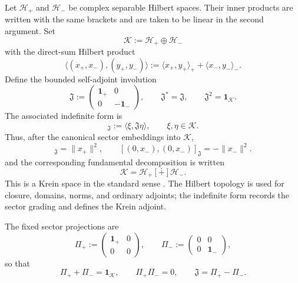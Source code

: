 \documentclass[11pt,reqno]{scrartcl}
\newcommand{\scrK}{\mathscr K}
\newcommand{\scrHp}{\mathscr H_{+}}
\newcommand{\scrHm}{\mathscr H_{-}}
\newcommand{\fundJ}{\mathfrak J}
\newcommand{\Pp}{\Pi_{+}}
\newcommand{\Pm}{\Pi_{-}}
\newcommand{\idop}{\mathbf 1}
\newcommand{\inner}[2]{\langle #1,#2\rangle}
\newcommand{\kInner}[2]{[#1,#2]_{\fundJ}}
\newcommand{\dsum}{\mathbin{[\dotplus]}}
\theoremstyle{plain}
\theoremstyle{definition}
\theoremstyle{remark}
\begin{document}
Let \(\scrHp\) and \(\scrHm\) be complex separable Hilbert spaces. Their inner
products are written with the same brackets and are taken to be linear in the
second argument. Set
\begin{equation}
  \scrK:=\scrHp\oplus\scrHm
\end{equation}
with the direct-sum Hilbert product
\begin{equation}
  \inner{(x_+,x_-)}{(y_+,y_-)}
  :=\inner{x_+}{y_+}_{+}+\inner{x_-}{y_-}_{-}.
\end{equation}
Define the bounded self-adjoint involution
\begin{equation}
  \fundJ:=
  \begin{pmatrix}
    \idop_{+}&0\\
    0&-\idop_{-}
  \end{pmatrix},
  \qquad
  \fundJ^*=\fundJ,
  \qquad
  \fundJ^2=\idop_{\scrK}.
  \label{eq:J}
\end{equation}
The associated indefinite form is
\begin{equation}
  \kInner{\xi}{\eta}:=\inner{\xi}{\fundJ\eta},
  \qquad \xi,\eta\in\scrK.
  \label{eq:Krein-form}
\end{equation}
Thus, after the canonical sector embeddings into \(\scrK\),
\begin{equation}
  \kInner{(x_+,0)}{(x_+,0)}=\|x_+\|^2,
  \qquad
  \kInner{(0,x_-)}{(0,x_-)}=-\|x_-\|^2.
\end{equation}
and the corresponding fundamental decomposition is written
\begin{equation}
  \boxed{\scrK=\scrHp\dsum\scrHm.}
  \label{eq:fundamental-decomposition}
\end{equation}
This is a Krein space in the standard sense \cite{Bognar,AzizovIokhvidov}.
The Hilbert topology is used for closure, domains, norms, and ordinary
adjoints; the indefinite form records the sector grading and defines the
Krein adjoint.

The fixed sector projections are
\begin{equation}
  \Pp:=
  \begin{pmatrix}\idop_+&0\\0&0\end{pmatrix},
  \qquad
  \Pm:=
  \begin{pmatrix}0&0\\0&\idop_-\end{pmatrix},
  \label{eq:sector-projections}
\end{equation}
so that
\begin{equation}
  \Pp+\Pm=\idop_{\scrK},
  \qquad
  \Pp\Pm=0,
  \qquad
  \fundJ=\Pp-\Pm.
\end{equation}
\end{document}

